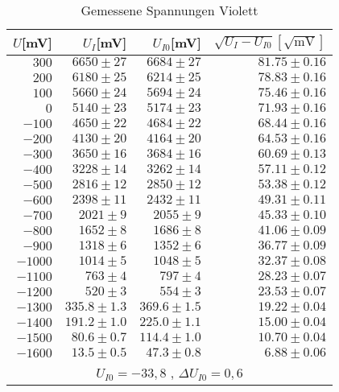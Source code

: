 \begin{table}[ht]
  \centering
  \caption{Gemessene Spannungen Violett}
    \begin{tabular}{r | r | r | r}
    \toprule
    $U$[mV] & $U_I$[mV] & $U_{I0}$[mV] & $\sqrt{U_I  - U_{I0}}[\sqrt{\text{mV}}]$\\
    \midrule
    $300 $  & $6650 \pm 27$ & $6684 \pm  27$ & $81.75 \pm  0.16$ \\
    $200$   &$ 6180 \pm 25$ &$ 6214 \pm  25$ & $78.83 \pm  0.16$ \\
    $100$   & $5660\pm  24$ & $5694 \pm  24$ & $75.46 \pm  0.16$ \\
    $0$     & $5140\pm  23$ & $5174 \pm  23$ & $71.93 \pm  0.16$ \\
    $-100$  & $4650 \pm  22$ & $4684 \pm 22$ &$ 68.44 \pm  0.16$\\
    $-200 $ & $4130\pm  20 $& $4164 \pm  20$ & $64.53 \pm  0.16$ \\
    $-300$  & $3650\pm  16$ & $3684 \pm  16$ & $60.69\pm  0.13 $\\
    $-400$  & $3228\pm  14$ & $3262 \pm  14$ &$ 57.11 \pm  0.12$ \\
   $ -500$  & $2816\pm  12$ & $2850 \pm  12$ & $53.38 \pm  0.12 $\\
    $-600$  & $2398\pm  11$ & $2432 \pm  11$ & $49.31 \pm  0.11$ \\
    $-700$  & $2021\pm  9$ & $2055 \pm  9$ & $45.33 \pm  0.10 $\\
    $-800$  & $1652\pm  8$ & $1686 \pm  8$ & $41.06 \pm  0.09$ \\
    $-900$  & $1318\pm  6$ & $1352 \pm  6$ & $36.77 \pm  0.09$ \\
    $-1000 $& $1014\pm  5$ & $1048 \pm  5$ & $32.37\pm  0.08$\\
    $-1100$ & $763\pm  4$ & $797 \pm  4$ & $28.23 \pm  0.07$ \\
   $ -1200$ & $520\pm  3$  & $554 \pm  3$ & $23.53 \pm  0.07$ \\
    $-1300$ & $335.8 \pm  1.3$ & $369.6 \pm  1.5$ & $19.22 \pm  0.04$ \\
    $-1400$ & $191.2 \pm  1.0$ & $225.0 \pm  1.1$& $15.00 \pm  0.04$ \\
    $-1500$ & $80.6  \pm  0.7$ & $114.4 \pm  1.0$ & $10.70 \pm  0.04$ \\
    $-1600$ & $13.5  \pm  0.5$ & $47.3  \pm  0.8 $&$ 6.88 \pm  0.06$\\
    \bottomrule
    \multicolumn{4}{c}{$U_{I0} = -33,8$ , $\Delta U_{I0} = 0,6$}
    \end{tabular}
    
\end{table}%

